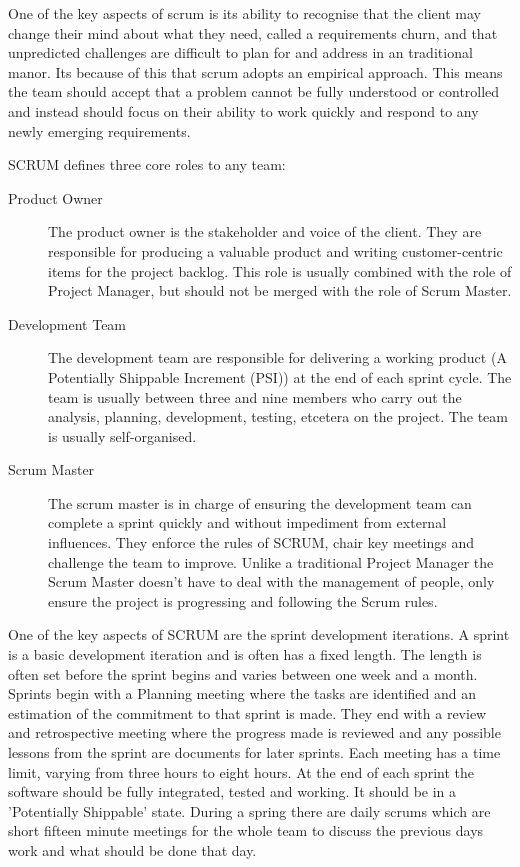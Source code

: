 \documentclass[11pt,a4paper]{article}
\begin{document}
One of the key aspects of scrum is its ability to recognise that the client may change their mind about what they need, called a requirements churn, and that unpredicted challenges are difficult to plan for and address in an traditional manor. Its because of this that scrum adopts an empirical approach. This means the team should accept that a problem cannot be fully understood or controlled and instead should focus on their ability to work quickly and respond to any newly emerging requirements. 

SCRUM defines three core roles to any team:

\begin{description}
\item[Product Owner] The product owner is the stakeholder and voice of the client. They are responsible for producing a valuable product and writing customer-centric items for the project backlog. This role is usually combined with the role of Project Manager, but should not be merged with the role of Scrum Master. 
\item[Development Team] The development team are responsible for delivering a working product (A Potentially Shippable Increment (PSI)) at the end of each sprint cycle. The team is usually between three and nine members who carry out the analysis, planning, development, testing, etcetera on the project. The team is usually self-organised.
\item[Scrum Master] The scrum master is in charge of ensuring the development team can complete a sprint quickly and without impediment from external influences. They enforce the rules of SCRUM, chair key meetings and challenge the team to improve. Unlike a traditional Project Manager the Scrum Master doesn't have to deal with the management of people, only ensure the project is progressing and following the Scrum rules. 
\end{description}

One of the key aspects of SCRUM are the sprint development iterations. A sprint is a basic development iteration and is often has a fixed length. The length is often set before the sprint begins and varies between one week and a month. Sprints begin with a Planning meeting where the tasks are identified and an estimation of the commitment to that sprint is made. They end with a  review and retrospective meeting where the progress made is reviewed and any possible lessons from the sprint are documents for later sprints. Each meeting has a time limit, varying from three hours to eight hours. At the end of each sprint the software should be fully integrated, tested and working. It should be in a 'Potentially Shippable' state. During a spring there are daily scrums which are short fifteen minute meetings for the whole team to discuss the previous days work and what should be done that day. 
\end{document}
